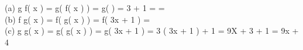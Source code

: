  \\

  \\

(a) \mspace{9mu} g \circ f\left( x \right) = g\left( f\left( x \right) \right) = g\left( \right) = 3 \cdot {} + 1 = =  \\

(b) \mspace{9mu} f \circ g\left( x \right) = f\left( g\left( x \right) \right) = f\left( 3x + 1 \right) =  \\

(c) \mspace{9mu} g \circ g\left( x \right) = g\left( g\left( x \right) \right) = g\left( 3x + 1 \right) = 3 \cdot \left( 3x + 1 \right) + 1 = 9X + 3 + 1 = 9x + 4

